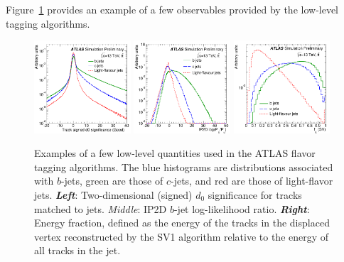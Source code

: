 
Figure~\ref{fig:ftag_low_level_var} provides an example of a few observables provided by the low-level tagging algorithms.

\begin{figure}[!htb]
    \begin{center}
        \includegraphics[width=0.32\textwidth]{figures/chapter3/ftag/ftag_track_d0_sig_ip2d}
        \includegraphics[width=0.32\textwidth]{figures/chapter3/ftag/ftag_ip2d_pb}
        \includegraphics[width=0.32\textwidth]{figures/chapter3/ftag/ftag_sv1_fE}
        \caption{
            Examples of a few low-level quantities used in the ATLAS flavor tagging algorithms.
            The blue histograms are distributions associated with $b$-jets, green are those of $c$-jets, and red
            are those of light-flavor jets.
            \textbf{\textit{Left}}: Two-dimensional (signed) $d_0$ significance for tracks matched to jets.
            \textit{Middle}: IP2D $b$-jet log-likelihood ratio.
            \textbf{\textit{Right}}: Energy fraction, defined as the energy of the tracks in the displaced
                vertex reconstructed by the SV1 algorithm relative to the energy of all tracks in the jet.
        }
        \label{fig:ftag_low_level_var}
    \end{center}
\end{figure}


